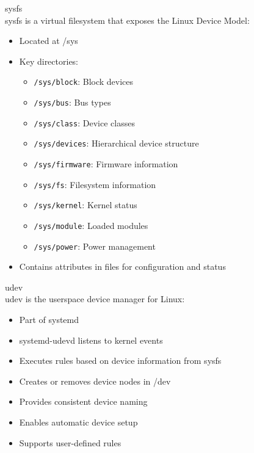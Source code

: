 \begin{definition}{sysfs}\\
    sysfs is a virtual filesystem that exposes the Linux Device Model:
    \begin{itemize}
        \item Located at /sys
        \item Key directories:
            \begin{itemize}
                \item \texttt{/sys/block}: Block devices
                \item \texttt{/sys/bus}: Bus types
                \item \texttt{/sys/class}: Device classes
                \item \texttt{/sys/devices}: Hierarchical device structure
                \item \texttt{/sys/firmware}: Firmware information
                \item \texttt{/sys/fs}: Filesystem information
                \item \texttt{/sys/kernel}: Kernel status
                \item \texttt{/sys/module}: Loaded modules
                \item \texttt{/sys/power}: Power management
            \end{itemize}
        \item Contains attributes in files for configuration and status
    \end{itemize}
\end{definition}

\begin{definition}{udev}\\
    udev is the userspace device manager for Linux:
    \begin{itemize}
        \item Part of systemd
        \item systemd-udevd listens to kernel events
        \item Executes rules based on device information from sysfs
        \item Creates or removes device nodes in /dev
        \item Provides consistent device naming
        \item Enables automatic device setup
        \item Supports user-defined rules
    \end{itemize}
\end{definition}

